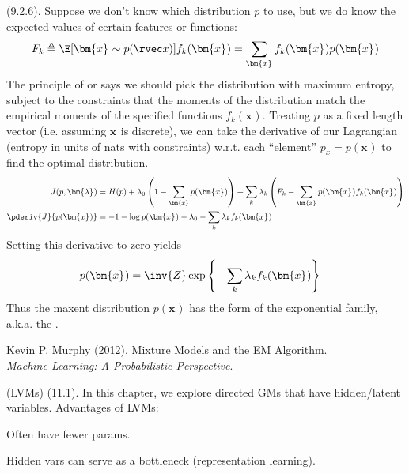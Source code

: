 \documentclass[11pt]{article}
\renewcommand\vec[2][]{\bm{#2}_{#1}}
\newcommand\myspace[1][]{\vspace{#1\bigskipamount}}
\newcommand\p{\Needspace{10\baselineskip} \noindent}
\begin{document}
\myspace
\p {} (9.2.6). Suppose we don't know which distribution $p$ to use, but we do know the expected values of certain features or functions:
\begin{align}
	F_k \triangleq \E[\vec x \sim p(\rvec x)]{f_k(\vec x)} = \sum_{\vec x} f_k(\vec x) p(\vec x)
\end{align}
The principle of  or  says we should pick the distribution with maximum entropy, subject to the constraints that the moments of the distribution match the empirical moments of the specified functions $f_k(\vec x)$. Treating $p$ as a fixed length vector (i.e. assuming $\vec x$ is discrete), we can take the derivative of our Lagrangian (entropy in units of nats with constraints) w.r.t. each ``element'' $p_x = p(\vec x)$ to find the optimal distribution.
\begin{align}
	J(p, \vec\lambda)
		&= H(p) + \lambda_0 \left( 1 - \sum_{\vec x} p(\vec x) \right) + \sum_k \lambda_k \left(F_k - \sum_{\vec x} p(\vec x) f_k(\vec x) \right) \\
	\pderiv{J}{p(\vec x)}
		&= -1 - \log p(\vec x) - \lambda_0 - \sum_k \lambda_k f_k(\vec x)
\end{align}
Setting this derivative to zero yields
\begin{align}
	p(\vec x) 
		&= \inv{Z} \exp\left\{ -\sum_k \lambda_k f_k(\vec x)  \right\}
\end{align}
Thus the maxent distribution $p(\vec x)$ has the form of the exponential family, a.k.a. the . 












\vspace{-1.7em}
{\scriptsize Kevin P. Murphy (2012). Mixture Models and the EM Algorithm.\\ \textit{Machine Learning: A Probabilistic Perspective}.\\ }

\p {} (LVMs) (11.1). In this chapter, we explore directed GMs that have hidden/latent variables. Advantages of LVMs:
\begin{compactenum}
	\item Often have fewer params.
	\item Hidden vars can serve as a bottleneck (representation learning).
\end{compactenum}
\end{document}
